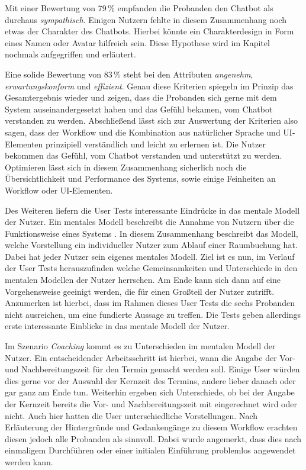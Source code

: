 Mit einer Bewertung von 79\,\% empfanden die Probanden den Chatbot als durchaus \textit{sympathisch}. Einigen Nutzern fehlte in diesem Zusammenhang noch etwas der Charakter des Chatbots. Hierbei könnte ein Charakterdesign in Form eines Namen oder Avatar hilfreich sein. Diese Hypothese wird im Kapitel  nochmals aufgegriffen und erläutert. 

Eine solide Bewertung von 83\,\% steht bei den Attributen \textit{angenehm}, \textit{erwartungskonform} und \textit{effizient}. Genau diese Kriterien spiegeln im Prinzip das Gesamtergebnis wieder und zeigen, dass die Probanden sich gerne mit dem System auseinandergesetzt haben und das Gefühl bekamen, vom Chatbot verstanden zu werden. Abschließend lässt sich zur Auswertung der Kriterien also sagen, dass der Workflow und die Kombination aus natürlicher Sprache und \ac{UI}-Elementen prinzipiell verständlich und leicht zu erlernen ist. Die Nutzer bekommen das Gefühl, vom Chatbot verstanden und unterstützt zu werden. Optimieren lässt sich in diesem Zusammenhang sicherlich noch die Übersichtlichkeit und Performance des Systems, sowie einige Feinheiten an Workflow oder \ac{UI}-Elementen.

Des Weiteren liefern die User Tests interessante Eindrücke in das mentale Modell der Nutzer. Ein mentales Modell beschreibt die Annahme von Nutzern über die Funktionsweise eines Systems \cite{rita_strebe_mental_2015}. In diesem Zusammenhang beschreibt das Modell, welche Vorstellung ein individueller Nutzer zum Ablauf einer Raumbuchung hat. Dabei hat jeder Nutzer sein eigenes mentales Modell. Ziel ist es nun, im Verlauf der User Tests herauszufinden welche Gemeinsamkeiten und Unterschiede in den mentalen Modellen der Nutzer herrschen. Am Ende kann sich dann auf eine Vorgehensweise geeinigt werden, die für einen Großteil der Nutzer zutrifft. Anzumerken ist hierbei, dass im Rahmen dieses User Tests die sechs Probanden nicht ausreichen, um eine fundierte Aussage zu treffen. Die Tests geben allerdings erste interessante Einblicke in das mentale Modell der Nutzer. 

Im Szenario \textit{Coaching} kommt es zu Unterschieden im mentalen Modell der Nutzer. Ein entscheidender Arbeitsschritt ist hierbei, wann die Angabe der Vor- und Nachbereitungszeit für den Termin gemacht werden soll. Einige User würden dies gerne vor der Auswahl der Kernzeit des Termins, andere lieber danach oder gar ganz am Ende tun. Weiterhin ergeben sich Unterschiede, ob bei der Angabe der Kernzeit bereits die Vor- und Nachbereitungszeit mit eingerechnet wird oder nicht. Auch hier hatten die User unterschiedliche Vorstellungen. Nach Erläuterung der Hintergründe und Gedankengänge zu diesem Workflow erachten diesen jedoch alle Probanden als sinnvoll. Dabei wurde angemerkt, dass dies nach einmaligem Durchführen oder einer initialen Einführung problemlos angewendet werden kann. 
